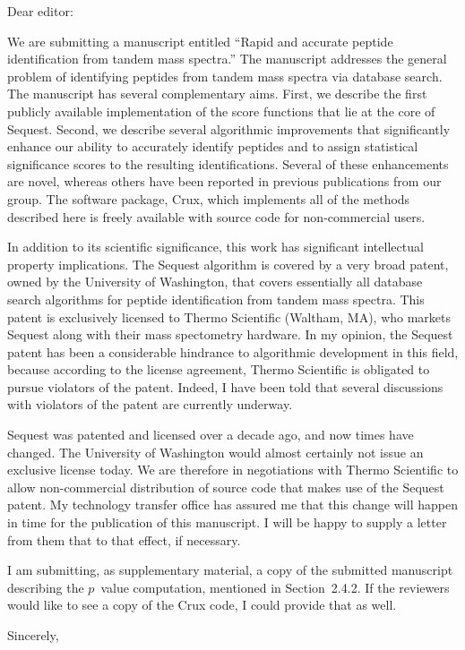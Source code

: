 \documentclass{letter}
\begin{document}
\begin{letter}{}

\opening{Dear editor:}

We are submitting a manuscript entitled ``Rapid and accurate peptide
identification from tandem mass spectra.''  The manuscript addresses
the general problem of identifying peptides from tandem mass spectra
via database search.  The manuscript has several complementary aims.
First, we describe the first publicly available implementation of the
score functions that lie at the core of {\sc Sequest}.  Second, we
describe several algorithmic improvements that significantly enhance
our ability to accurately identify peptides and to assign statistical
significance scores to the resulting identifications.  Several of
these enhancements are novel, whereas others have been reported in
previous publications from our group.  The software package, Crux,
which implements all of the methods described here is freely available
with source code for non-commercial users.

In addition to its scientific significance, this work has significant
intellectual property implications.  The {\sc Sequest} algorithm is
covered by a very broad patent, owned by the University of Washington,
that covers essentially all database search algorithms for peptide
identification from tandem mass spectra.  This patent is exclusively
licensed to Thermo Scientific (Waltham, MA), who markets {\sc Sequest}
along with their mass spectometry hardware.  In my opinion, the {\sc
Sequest} patent has been a considerable hindrance to algorithmic
development in this field, because according to the license agreement,
Thermo Scientific is obligated to pursue violators of the patent.
Indeed, I have been told that several discussions with violators of
the patent are currently underway.

{\sc Sequest} was patented and licensed over a decade ago, and now
times have changed.  The University of Washington would almost
certainly not issue an exclusive license today.  We are therefore in
negotiations with Thermo Scientific to allow non-commercial
distribution of source code that makes use of the {\sc Sequest}
patent.  My technology transfer office has assured me that this change
will happen in time for the publication of this manuscript.  I will be
happy to supply a letter from them that to that effect, if necessary.

I am submitting, as supplementary material, a copy of the submitted
manuscript describing the $p$~value computation, mentioned in
Section~2.4.2.  If the reviewers would like to see a copy of the Crux
code, I could provide that as well.

\closing{Sincerely,}

\end{letter}
\end{document}
